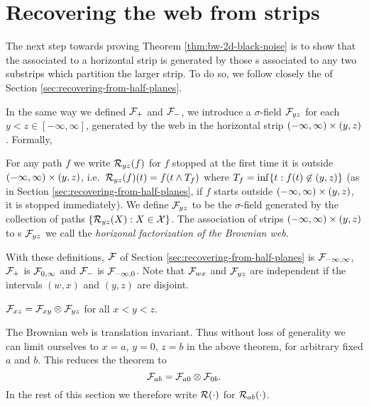 {
\section{Recovering the web from strips}
\label{sec:recovering-from-strips}

The next step towards proving Theorem \ref{thm:bw-2d-black-noise} is
to show that the \sigfield{} associated to a horizontal strip is
generated by those \sigfield{}s associated to any two substrips
which partition the larger strip.  To do so, we follow closely the
 of Section \ref{sec:recovering-from-half-planes}.

\newcommand{\strip}{(-\infty, \infty) \cross (y,z)}

In the same way we defined $\mathcal{F}_{+}$ and $\mathcal{F}_{-}$,
we introduce a $\sigma$-field $\mathcal{F}_{y z}$ for each $y < z \in
[-\infty, \infty]$, generated by the web in the horizontal strip
$\strip$.  Formally,

\begin{definition}
  \newcommand{\T}{\stripleavetime{f}}
  \label{def:restrict}
  For any path $f$ we write $\mathcal{R}_{{y}{z}}(f)$ for $f$ stopped at
  the first time it is outside $\strip$,
  i.e.\ $\restrict{y}{z}{f}(t) = f(t \minsym \T)$ where $\T = \inf\{ t
  : f(t) \not\in (y,z) \}$ (as in Section
  \ref{sec:recovering-from-half-planes}, if $f$ starts
  outside $\strip$, it is stopped immediately).  We define
  $\mathcal{F}_{y z}$ to be the $\sigma$-field generated by the collection
  of paths $\{\mathcal{R}_{{y}{z}}(X) : X \in \mathcal{X} \}$.
  \label{def:horizontal-factorization}
  The association of strips $\strip$ to \sigfield{}s $\mathcal{F}_{y z}$ we call
  the \emph{horizonal factorization of the Brownian web}.
\end{definition}

With these definitions, $\mathcal{F}$ of Section
\ref{sec:recovering-from-half-planes} is
$\mathcal{F}_{-\infty,\infty}$, $\mathcal{F}_{+}$ is
$\mathcal{F}_{0,\infty}$ and $\mathcal{F}_{-}$ is
$\mathcal{F}_{-\infty,0}$.
Note that
  $\mathcal{F}_{w x}$ and $\mathcal{F}_{y z}$ are independent if the
  intervals $(w,x)$ and $(y,z)$ are disjoint.

\renewcommand{\top}{b}
\newcommand{\bottom}{a}

\begin{theorem}\label{thm:recoveringfromstrips}
  $\mathcal{F}_{x z} = \mathcal{F}_{x y} \otimes \mathcal{F}_{y z}$ for all $x < y < z$.
\end{theorem}

The Brownian web is translation invariant.  Thus without loss of
generality we can limit ourselves to $x=a$, $y=0$, $z=b$ in the above
theorem, for arbitrary fixed $a$ and $b$.  This reduces the theorem to
\[
\mathcal{F}_{a b} = \mathcal{F}_{a 0} \otimes \mathcal{F}_{0 b}.
\]
In the rest of this
section we therefore write $\mathcal{R}(\cdot)$ for
$\restrict{\bottom}{\top}{\cdot}$.

}
